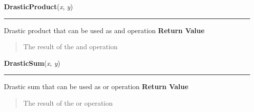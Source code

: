     \label{peach:fuzzy:norms:DrasticProduct}

    \vspace{0.5ex}

\hspace{.8\funcindent}\begin{boxedminipage}{\funcwidth}

    \raggedright \textbf{DrasticProduct}(\textit{x}, \textit{y})

    \vspace{-1.5ex}

    \rule{\textwidth}{0.5\fboxrule}
\setlength{\parskip}{2ex}

Drastic product that can be used as and operation
\setlength{\parskip}{1ex}
      \textbf{Return Value}
    \vspace{-1ex}

      \begin{quote}

The result of the and operation
      \end{quote}

    \end{boxedminipage}

    \label{peach:fuzzy:norms:DrasticSum}

    \vspace{0.5ex}

\hspace{.8\funcindent}\begin{boxedminipage}{\funcwidth}

    \raggedright \textbf{DrasticSum}(\textit{x}, \textit{y})

    \vspace{-1.5ex}

    \rule{\textwidth}{0.5\fboxrule}
\setlength{\parskip}{2ex}

Drastic sum that can be used as or operation
\setlength{\parskip}{1ex}
      \textbf{Return Value}
    \vspace{-1ex}

      \begin{quote}

The result of the or operation
      \end{quote}

    \end{boxedminipage}

